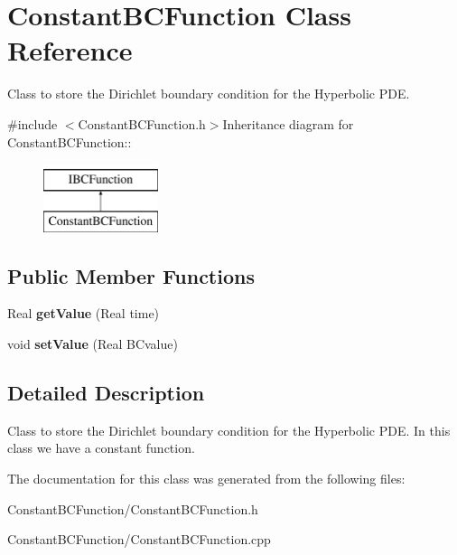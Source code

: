 \hypertarget{classConstantBCFunction}{
\section{ConstantBCFunction Class Reference}
\label{classConstantBCFunction}
}


Class to store the Dirichlet boundary condition for the Hyperbolic PDE.  


{\ttfamily \#include $<$ConstantBCFunction.h$>$}Inheritance diagram for ConstantBCFunction::\begin{figure}[H]
\begin{center}
\leavevmode
\includegraphics[height=2cm]{classConstantBCFunction}
\end{center}
\end{figure}
\subsection*{Public Member Functions}
\begin{DoxyCompactItemize}
\item 
\hypertarget{classConstantBCFunction_ac8b4e6d431c17a938b26b9ab33dc2245}{
Real {\bfseries getValue} (Real time)}
\label{classConstantBCFunction_ac8b4e6d431c17a938b26b9ab33dc2245}

\item 
\hypertarget{classConstantBCFunction_a061c12e0c2e73b1026035d642092749b}{
void {\bfseries setValue} (Real BCvalue)}
\label{classConstantBCFunction_a061c12e0c2e73b1026035d642092749b}

\end{DoxyCompactItemize}


\subsection{Detailed Description}
Class to store the Dirichlet boundary condition for the Hyperbolic PDE. In this class we have a constant function. 

The documentation for this class was generated from the following files:\begin{DoxyCompactItemize}
\item 
ConstantBCFunction/ConstantBCFunction.h\item 
ConstantBCFunction/ConstantBCFunction.cpp\end{DoxyCompactItemize}
